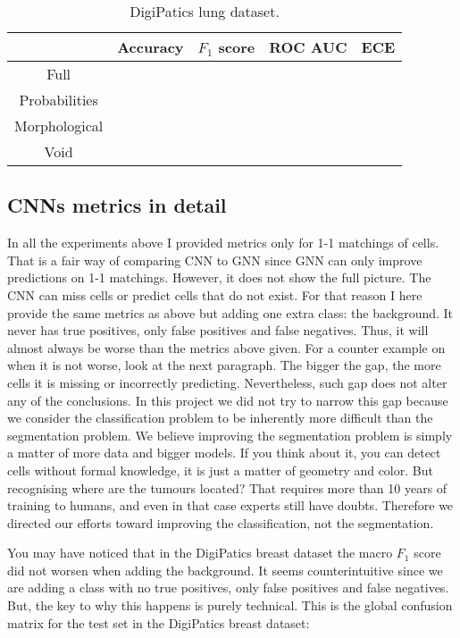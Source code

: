 \begin{table}[ht]
\vspace{0.5cm}

\begin{tabular}{c|c|c|c|c|}
  \cline{2-5}
  & Accuracy & $F_1$ score & ROC AUC & ECE \\ \hline
\multicolumn{1}{|c|}{Full}  &  &  &  &  \\ \hline
\multicolumn{1}{|c|}{Probabilities}  &  &  &  &  \\ \hline
\multicolumn{1}{|c|}{Morphological}  &  &  &  &  \\ \hline
\multicolumn{1}{|c|}{Void}  &  &  &  &  \\ \hline
\end{tabular}
\caption{DigiPatics lung dataset.}
    \label{tab:void-gnn}
\end{table}

\newpage
\subsection{CNNs metrics in detail}

In all the experiments above I provided metrics only for 1-1 matchings of cells. That is a fair way of comparing CNN to GNN since GNN can only improve predictions on 1-1 matchings. However, it does not show the full picture. The CNN can miss cells or predict cells that do not exist. For that reason I here provide the same metrics as above but adding one extra class: the background. It never has true positives, only false positives and false negatives. Thus, it will almost always be worse than the metrics above given. For a counter example on when it is not worse, look at the next paragraph. The bigger the gap, the more cells it is missing or incorrectly predicting. Nevertheless, such gap does not alter any of the conclusions. In this project we did not try to narrow this gap because we consider the classification problem to be inherently more difficult than the segmentation problem. We believe improving the segmentation problem is simply a matter of more data and bigger models. If you think about it, you can detect cells without formal knowledge, it is just a matter of geometry and color. But recognising where are the tumours located? That requires more than 10 years of training to humans, and even in that case experts still have doubts. Therefore we directed our efforts toward improving the classification, not the segmentation.

You may have noticed that in the DigiPatics breast dataset the macro $F_1$ score did not worsen when adding the background. It seems counterintuitive since we are adding a class with no true positives, only false positives and false negatives. But, the key to why this happens is purely technical. This is the global confusion matrix for the test set in the DigiPatics breast dataset:

